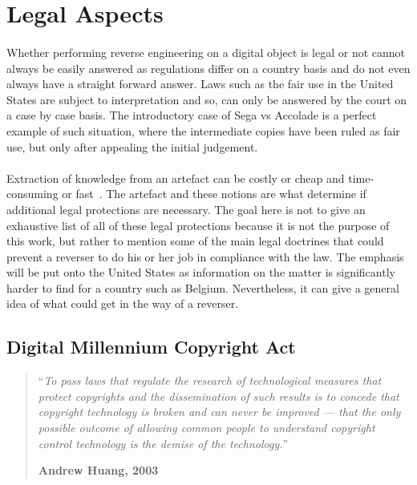\section{Legal Aspects}
\paragraph{}
Whether performing reverse engineering on a digital object is legal or not cannot always be easily answered as regulations differ on a country basis and do not even always have a straight forward answer. Laws such as the fair use in the United States are subject to interpretation and so, can only be answered by the court on a case by case basis. The introductory case of Sega vs Accolade is a perfect example of such situation, where the intermediate copies have been ruled as fair use, but only after appealing the initial judgement.

\paragraph{}
Extraction of knowledge from an artefact can be costly or cheap and time-consuming or fast~\cite{samuelson2002law}. The artefact and these notions are what determine if additional legal protections are necessary. The goal here is not to give an exhaustive list of all of these legal protections because it is not the purpose of this work, but rather to mention some of the main legal doctrines that could prevent a reverser to do his or her job in compliance with the law. The emphasis will be put onto the United States as information on the matter is significantly harder to find for a country such as Belgium. Nevertheless, it can give a general idea of what could get in the way of a reverser.

\subsection{Digital Millennium Copyright Act}
\begin{quotation}
	\noindent ``\emph{To pass laws that regulate the research of technological measures that protect copyrights and the dissemination of such results is to concede that copyright technology is broken and can never be improved — that the only possible outcome of allowing common people to understand copyright control technology is the demise of the technology.}''
	\begin{flushright}\textbf{Andrew Huang, 2003}\end{flushright}
\end{quotation}

